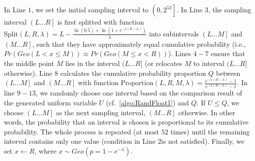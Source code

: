 In Line $1$, we set the initial sampling interval to $\left(0,2^{52}\right] $.
In Line $ 3$, the sampling interval $\left(L\ldots R\right] $ is first splitted with function $\text{Split}\left(L,R,\lambda\right)=L-\frac{\ln\left(0.5\right)+\ln\left(1+e^{-\lambda\left(R-L\right) }\right) }{\lambda}$ into subintervals $\left(L\ldots M\right] $ and $\left(M\ldots R\right] $, such that they have approximately equal cumulative probability (i.e., $Pr\left(Geo\left(L<x\leq M\right) \right) \approx Pr \left(Geo\left(M  \leq x  < R\right) \right)  $).
Lines $4-7$ ensure that the middle point $M$ lies in the interval $(L\ldots R]$ (or relocates $M$ to interval $(L\ldots R]$ otherwise).
Line $8$ calculates the cumulative probability proportion $Q$ between $\left(L\ldots M\right] $ and $\left(M\ldots R\right] $ with function $\text{Proportion}\left(L,R,M,\lambda\right)=\frac{e^{-\lambda\left(M-L\right) }-1}{e^{-\lambda\left(R-L\right) }-1} $.
In line $9-13$, we randomly choose one interval based on the comparison result of the generated uniform variable $U$ (cf.~\autoref{algo:RandFloat1}) and $Q$.
If $U \leq Q$, we choose $\left(L\ldots M\right] $ as the next sampling interval, $\left(M\ldots R\right] $ otherwise. In other words, the probability that an interval is chosen is proportional to its cumulative probability.
The whole process is repeated (at most $52$ times) until the remaining interval contains only one value (condition in Line $2$is not satisfied). Finally, we set $x\gets R$, where $x\sim Geo\left(p=1-e^{-\lambda}\right)$.






